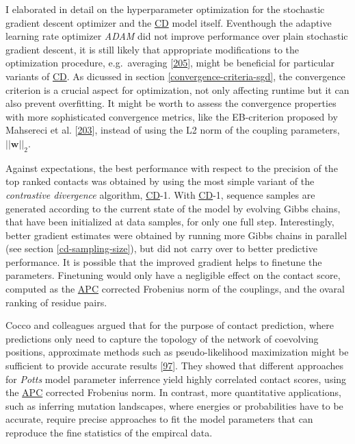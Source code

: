 \documentclass[11pt,a4paper,twoside]{book}
\newcommand{\w}{\mathbf{w}}
\theoremstyle{definition}
\theoremstyle{definition}
\theoremstyle{remark}
\begin{document}
I elaborated in detail on the hyperparameter optimization for the
stochastic gradient descent optimizer and the
\protect\hyperlink{abbrev}{CD} model itself. Eventhough the adaptive
learning rate optimizer \emph{ADAM} did not improve performance over
plain stochastic gradient descent, it is still likely that appropriate
modifications to the optimization procedure, e.g.~averaging
{[}\protect\hyperlink{ref-Ma2016}{205}{]}, might be beneficial for
particular variants of \protect\hyperlink{abbrev}{CD}. As dicussed in
section \ref{convergence-criteria-sgd}, the convergence criterion is a
crucial aspect for optimization, not only affecting runtime but it can
also prevent overfitting. It might be worth to assess the convergence
properties with more sophisticated convergence metrics, like the
EB-criterion proposed by Mahsereci et al.
{[}\protect\hyperlink{ref-Mahsereci2017}{203}{]}, instead of using the
L2 norm of the coupling parameters, \(||\w||_2\).

Against expectations, the best performance with respect to the precision
of the top ranked contacts was obtained by using the most simple variant
of the \emph{contrastive divergence} algorithm,
\protect\hyperlink{abbrev}{CD}-1. With \protect\hyperlink{abbrev}{CD}-1,
sequence samples are generated according to the current state of the
model by evolving Gibbs chains, that have been initialized at data
samples, for only one full step. Interestingly, better gradient
estimates were obtained by running more Gibbs chains in parallel (see
section \ref{cd-sampling-size}), but did not carry over to better
predictive performance. It is possible that the improved gradient helps
to finetune the parameters. Finetuning would only have a negligible
effect on the contact score, computed as the
\protect\hyperlink{abbrev}{APC} corrected Frobenius norm of the
couplings, and the ovaral ranking of residue pairs.

Cocco and colleagues argued that for the purpose of contact prediction,
where predictions only need to capture the topology of the network of
coevolving positions, approximate methods such as pseudo-likelihood
maximization might be sufficient to provide accurate results
{[}\protect\hyperlink{ref-Cocco2017}{97}{]}. They showed that different
approaches for \emph{Potts} model parameter inferrence yield highly
correlated contact scores, using the \protect\hyperlink{abbrev}{APC}
corrected Frobenius norm. In contrast, more quantitative applications,
such as inferring mutation landscapes, where energies or probabilities
have to be accurate, require precise approaches to fit the model
parameters that can reproduce the fine statistics of the empircal data.
\end{document}
